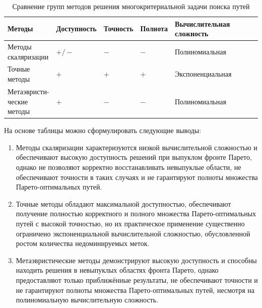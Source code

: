 \begin{table}[h]
\centering
\caption{Сравнение групп методов решения многокритериальной задачи поиска путей}
\label{tab:comparison_methods}


\begin{tabular}{|m{3.1cm}|>{\centering\arraybackslash}m{3.3cm}|
>{\centering\arraybackslash}m{2.3cm}|
>{\centering\arraybackslash}m{2.1cm}|
>{\centering\arraybackslash}m{4cm}|}

\hline
\textbf{Методы} 
& \textbf{Доступность} 
& \textbf{Точность} 
& \textbf{Полнота}
& \textbf{Вычислительная сложность} \\ \hline

\makecell[l]{Методы\\скаляризации}
& $+/-$
& $-$
& $-$
& \makecell{Полиномиальная\\\cite{article}} \\ \hline

\makecell[l]{Точные\\методы}
& $+$ 
& $+$ 
& $+$
& \makecell{Экспоненциальная\\\cite{euler2024}} \\ \hline

\makecell[l]{Метаэвристи-\\ческие\\методы}
& $+$ 
& $-$ 
& $-$
& \makecell{Полиномиальная\\\cite{May2023ACOReport, BianQian2022NSGAII}} \\ \hline

\end{tabular}
\end{table}

На основе таблицы можно сформулировать следующие выводы:

\begin{enumerate}[label=---]
    \item Методы скаляризации характеризуются низкой вычислительной сложностью и обеспечивают высокую доступность решений при выпуклом фронте Парето, однако не позволяют корректно восстанавливать невыпуклые области, не обеспечивают точности в таких случаях и не гарантируют полноты множества Парето-оптимальных путей.
    
    \item Точные методы обладают максимальной доступностью, обеспечивают получение полностью корректного и полного множества Парето-оптимальных путей с высокой точностью, но их практическое применение существенно ограничено экспоненциальной вычислительной сложностью, обусловленной ростом количества недоминируемых меток.
    
    \item Метаэвристические методы демонстрируют высокую доступность и способны находить решения в невыпуклых областях фронта Парето, однако предоставляют только приближённые результаты, не обеспечивают точности и не гарантируют полноты множества Парето-оптимальных путей, несмотря на полиномиальную вычислительную сложность.
\end{enumerate}

